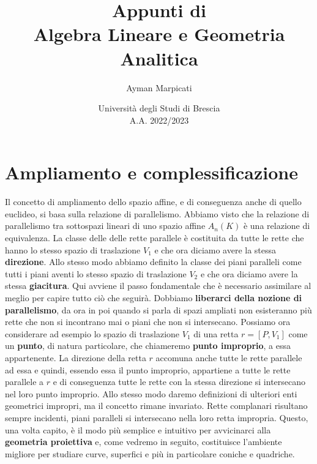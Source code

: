 \documentclass[twoside]{report}
\title{\Huge{Appunti di}\\Algebra Lineare e Geometria Analitica}
\author{\Large{Ayman Marpicati}}
\date{\normalsize{Università degli Studi di Brescia}\\A.A. 2022/2023}
\begin{document}
\maketitle
\cleardoublepage
\tableofcontents
\null\newpage

\setlength{\headheight}{15pt}

\pagestyle{fancy}
\fancyhead{} %
\fancyhead[LO]{\rightmark}
\fancyhead[RO]{\thepage}
\fancyhead[RE]{\leftmark}
\fancyhead[LE]{\thepage}
\fancyfoot{} %










\chapter{Ampliamento e complessificazione}
Il concetto di ampliamento dello spazio affine, e di conseguenza anche di quello euclideo, si basa sulla relazione di parallelismo. Abbiamo visto che la relazione di parallelismo tra sottospazi lineari di uno spazio affine \(A_n(K)\) è una relazione di equivalenza. La classe delle delle rette parallele è costituita da tutte le rette che hanno lo stesso spazio di traslazione \(V_1\) e che ora diciamo avere la stessa \textbf{direzione}. Allo stesso modo abbiamo definito la classe dei piani paralleli come tutti i piani aventi lo stesso spazio di traslazione \(V_2\) e che ora diciamo avere la stessa \textbf{giacitura}. Qui avviene il passo fondamentale che è necessario assimilare al meglio per capire tutto ciò che seguirà. Dobbiamo \textbf{liberarci della nozione di parallelismo}, da ora in poi quando si parla di spazi ampliati non esisteranno più rette che non si incontrano mai o piani che non si intersecano. Possiamo ora considerare ad esempio lo spazio di traslazione \(V_1\) di una retta \(r = [P, V_1]\) come un \textbf{punto}, di natura particolare, che chiameremo \textbf{punto improprio}, a essa appartenente. La direzione della retta \(r\) accomuna anche tutte le rette parallele ad essa e quindi, essendo essa il punto improprio, appartiene a tutte le rette parallele a \(r\) e di conseguenza tutte le rette con la stessa direzione si intersecano nel loro punto improprio. Allo stesso modo daremo definizioni di ulteriori enti geometrici impropri, ma il concetto rimane invariato. Rette complanari risultano sempre incidenti, piani paralleli si intersecano nella loro retta impropria. Questo, una volta capito, è il modo più semplice e intuitivo per avvicinarci alla \textbf{geometria proiettiva} e, come vedremo in seguito, costituisce l'ambiente migliore per studiare curve, superfici e più in particolare coniche e quadriche.
\end{document}
